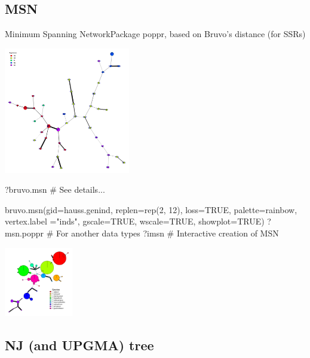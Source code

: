 \documentclass[compress, ucs, xelatex, 11pt, xcolor=svgnames,
  hyperref={
    bookmarks=true,
    unicode=true,
    colorlinks=true,
    pdftitle={Molecular data in R},
    plainpages=false,
    pdfauthor={Vojtech Zeisek},
    pdfsubject={Course about phylogeny and evolution in R},
    pdfcreator={XeLaTeX},
    pdfkeywords={R, evolution, phylogeny, molecular data},
    linkcolor=Tomato,
    anchorcolor=SaddleBrown,
    citecolor=Goldenrod,
    filecolor=DarkMagenta,
    menucolor=Sienna,
    urlcolor=DarkTurquoise,
    pdftex},
  url={hyphens, lowtilde} %
  ]{beamer}
\begin{document}
\subsection{MSN}

\begin{frame}[fragile]{Minimum Spanning Network}{Package poppr, based on Bruvo's distance (for SSRs)}
\label{MSN}
\begin{multicols}{2}
  \begin{center}
    \includegraphics[height=5.5cm]{msn.png}
  \end{center}
  \begin{spluscode}
    ?bruvo.msn # See details...
  \end{spluscode}
  \columnbreak
  \begin{spluscode}
    bruvo.msn(gid=hauss.genind,
      replen=rep(2, 12), loss=TRUE,
      palette=rainbow, vertex.label
      ="inds", gscale=TRUE,
      wscale=TRUE, showplot=TRUE)
    ?msn.poppr # For another data types
    ?imsn # Interactive creation of MSN
  \end{spluscode}
  \begin{center}
    \includegraphics[width=3cm]{msn-bruvo_no_labels.png}
  \end{center}
\end{multicols}
\end{frame}

\subsection{NJ (and UPGMA) tree}
\end{document}
